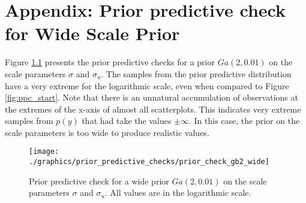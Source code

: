 \chapter{Appendix: Prior predictive check for Wide Scale Prior}
\label{appendix:wide_prior}

Figure \ref{fig:ppc_wide} presents the prior predictive checks for a prior $Ga(2, 0.01)$ on the scale parameters $\sigma$ and $\sigma_u$.
The samples from the prior predictive distribution have a very extreme for the logarithmic scale, even when compared to Figure \ref{fig:ppc_start}.
Note that there is an unnatural accumulation of observations at the extremes of the x-axis of almost all scatterplots.
This indicates very extreme samples from $p(y)$ that had take the values $\pm \infty$.
In this case, the prior on the scale parameters is too wide to produce realistic values.

\begin{figure}[h]
    \centering
    \texttt{[image: ./graphics/prior\_predictive\_checks/prior\_check\_gb2\_wide]}
    \caption[Prior predictive check for wide scale prior.]{Prior predictive check for a wide prior $Ga(2, 0.01)$ on the scale parameters $\sigma$ and $\sigma_u$. All values are in the logarithmic scale.}
    \label{fig:ppc_wide}
\end{figure}

